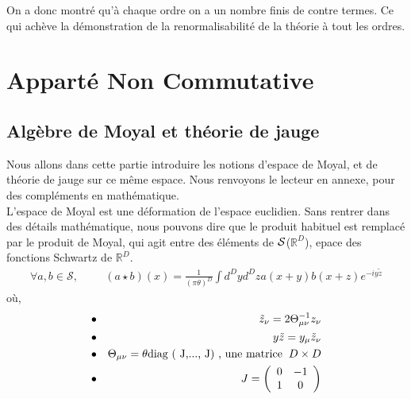 \documentclass[a4paper,11pt]{article}
\theoremstyle{plain}
\theoremstyle{definition}
\theoremstyle{remark}
\numberwithin{equation}{section}
\numberwithin{equation}{subsection}
\numberwithin{figure}{section}
\begin{document}
\noindent
On a donc montré qu'à chaque ordre on a un nombre finis de contre termes. Ce qui achève la démonstration de la renormalisabilité de la théorie
à tout les ordres.  

\section{Apparté Non Commutative}


\subsection{Algèbre de Moyal et théorie de jauge}

\noindent
Nous allons dans cette partie introduire les notions d'espace de Moyal, et de théorie de jauge sur ce même espace. Nous renvoyons le lecteur en 
annexe, pour des compléments en mathématique.\\

\noindent
L'espace de Moyal est une déformation de l'espace euclidien. Sans rentrer dans des détails mathématique, nous pouvons dire que le produit habituel 
est remplacé par le produit de Moyal, qui agit entre des éléments de $\cal{S}$($\mathbb{R}^{D}$), epace des fonctions Schwartz de $\mathbb{R}^{D}$.
\begin{eqnarray}
 \forall a,b \in \mathcal{S} , \hspace{1cm}  (a \star b) (x)  = \frac{1}{(\pi \theta)^{D}}  \int  d^{D}y    d^{D}z   a(x+y)   b(x+z)   
e^{-i y \tilde{z} }
\end{eqnarray}
où,
\begin{eqnarray}
 &\bullet&  \tilde{z}_{\nu}  =  2 \Theta^{-1}_{\mu \nu} z_{\nu}  \\
 &\bullet&  y \tilde{z} = y_{\mu}  \tilde{z}_{\nu}  \\
 &\bullet&  \Theta_{\mu \nu}  =  \theta  \text{diag ( J,..., J) , une matrice} \hspace{2mm} D \times D  \\
 &\bullet&  J = 
\left(
  \begin{array}{ c c }
     0 & -1 \\
     1 & 0
  \end{array} 
\right)
\end{eqnarray}
\end{document}
